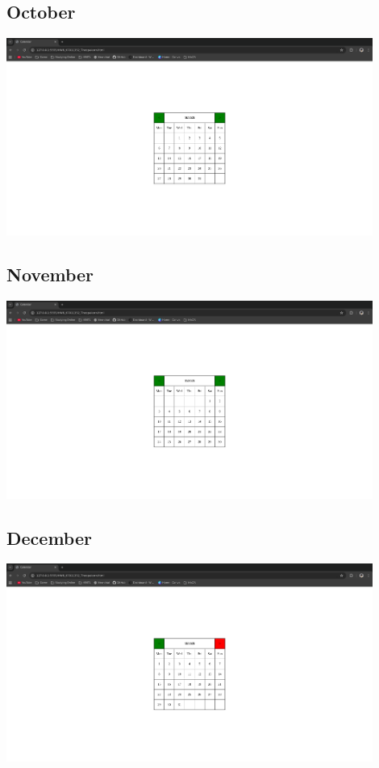 \documentclass[12pt]{report} %
\begin{document}
\subsection*{October}
\includegraphics[width=12cm]{./images/Output10.png} \\
\subsection*{November}
\includegraphics[width=12cm]{./images/Output11.png} \\
\subsection*{December}
\includegraphics[width=12cm]{./images/Output12.png} \\
\end{document}
